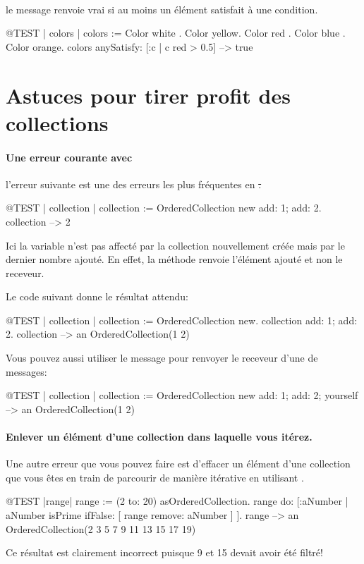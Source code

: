 \documentclass[a4paper,10pt,twoside]{book}
\begin{document}
\paragraph{} le message  renvoie vrai si au moins un \'el\'ement satisfait \`a une condition. 

\begin{code}{@TEST | colors | colors := {Color white . Color yellow. Color red . Color blue . Color orange}.}
colors anySatisfy: [:c | c red > 0.5] --> true
\end{code}
\section{Astuces pour tirer profit des collections}

\paragraph{Une erreur courante avec } l'erreur
suivante est une des erreurs les plus fr\'equentes en \st.

\begin{code}{@TEST | collection | }
collection := OrderedCollection new add: 1; add: 2.
collection --> 2
\end{code}
\noindent
Ici la variable  n'est pas affect\'e par la collection nouvellement cr\'e\'ee mais par le dernier nombre ajout\'e.
En effet, la m\'ethode  renvoie l'\'el\'ement ajout\'e et non le receveur.

Le code suivant donne le r\'esultat attendu:
\begin{code}{@TEST | collection |}
collection := OrderedCollection new.
collection add: 1; add: 2.
collection --> an OrderedCollection(1 2)
\end{code}

Vous pouvez aussi utiliser le message  pour
renvoyer le receveur d'une  de messages:

\begin{code}{@TEST | collection |}
collection := OrderedCollection new add: 1; add: 2; yourself --> an OrderedCollection(1 2)
\end{code}

\paragraph{Enlever un \'el\'ement d'une collection dans laquelle vous it\'erez.}
Une autre erreur que vous pouvez faire est d'effacer un \'el\'ement d'une collection que vous \^etes en train de parcourir de mani\`ere it\'erative en utilisant .
\begin{code}{@TEST |range|}
range := (2 to: 20) asOrderedCollection.
range do: [:aNumber | aNumber isPrime ifFalse: [ range remove: aNumber ] ].
range --> an OrderedCollection(2 3 5 7 9 11 13 15 17 19)
\end{code}
\noindent
Ce r\'esultat est clairement incorrect puisque 9 et 15 devait avoir \'et\'e
filtr\'e!
\end{document}
